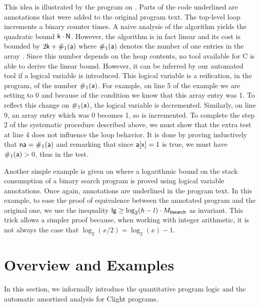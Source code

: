 \documentclass[nocopyrightspace,preprint]{sigplanconf}
\newcommand{\ifshort}[2]{\ifx\fullversion\undefined{#1}\else{#2}\fi}
\newcommand{\sectskip}[0]{\ifshort{\vspace{-3pt}}{}}
\newcommand{\aftersectskip}[0]{\ifshort{\vspace{-1pt}}{}}
\newcommand{\pref}[1]{\prettyref{#1}}
\begin{document}
This idea is illustrated by the program on \pref{fig:xmplincaux}.
Parts of the code underlined are annotations that were added
to the original program text.  The top-level loop increments
a binary counter  times.  A naive analysis of
the algorithm yields the quadratic bound $\mathsf{k}\cdot\mathsf{N}$.
However, the algorithm is in fact linear and its cost is bounded
by $2\mathsf{k} + \#_1(\mathsf{a})$ where $\#_1(\mathsf{a})$ denotes
the number of one entries in the array .  Since this
number depends on the heap contents, no tool available
for C is able to derive the linear bound.  However, it can be inferred
by our automated tool if a logical variable  is introduced.
This logical variable is a reification, in the program, of the
number $\#_1(\mathsf{a})$.  For example, on line 5 of the example
we are setting  to 0 and because of the condition we
know that this array entry was 1.  To reflect this change on
$\#_1(\mathsf{a})$, the logical variable  is decremented.
Similarly, on line 9, an array entry which was 0 becomes 1, so
 is incremented.  To complete the step 2 of the systematic
procedure described above, we must show that the extra test
 at line 4 does not influence the loop behavior.  It
is done by proving inductively that $\mathsf{na} = \#_1(\mathsf{a})$
and remarking that since $\mathsf{a[x]} = 1$ is true, we must have
$\#_1(\mathsf{a}) > 0$, thus  in the test. %

Another simple example is given on \pref{fig:xmplbsaux} where
a logarithmic bound on the stack consumption of a binary search
program is proved using logical variable annotations.  Once again,
annotations are underlined in the program text.  In this example,
to ease the proof of equivalence between the annotated program
and the original one, we use the inequality $\mathsf{lg} \ge
\log_2(h-l)\cdot M_{\mathsf{bsearch}}$ as invariant.  This trick
allows a simpler proof because, when working with integer
arithmetic, it is not always the case that $\log_2(x/2) =
\log_2(x)-1$.


\sectskip
\section{Overview and Examples}
\label{sec:inform}
\aftersectskip

In this section, we informally introduce the quantitative program
logic and the automatic amortized analysis for Clight programs.
\end{document}
